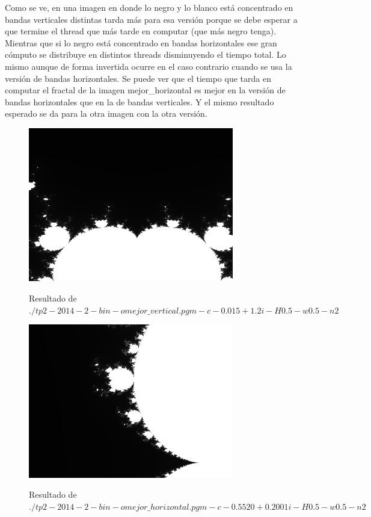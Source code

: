\documentclass[a4paper,10pt]{article}
\begin{document}
Como se ve, en una imagen en donde lo negro y lo blanco está concentrado en bandas verticales distintas tarda más para esa versión porque se debe esperar a que termine el thread que más tarde en computar (que más negro tenga). Mientras que si lo negro está concentrado en bandas horizontales ese gran cómputo se distribuye en distintos threads disminuyendo el tiempo total. Lo mismo aunque de forma invertida ocurre en el caso contrario cuando se usa la versión de bandas horizontales.
Se puede ver que el tiempo que tarda en computar el fractal de la imagen mejor\_horizontal es mejor en la versión de bandas horizontales que en la de bandas verticales. Y el mismo resultado esperado se da para la otra imagen con la otra versión.

\begin{figure}[H]
\begin{center}
\includegraphics[width=0.8\textwidth]{./mejorVertical.png}
\label{fig:def}
\caption{Resultado de $./tp2-2014-2-bin -o mejor\_vertical.pgm -c -0.015+1.2i -H 0.5 -w 0.5 -n 2$}
\end{center}
\end{figure}

\begin{figure}[H]
\begin{center}
\includegraphics[width=0.8\textwidth]{./mejorHorizontal.png}
\label{fig:def}
\caption{Resultado de $./tp2-2014-2-bin -o mejor\_horizontal.pgm -c -0.5520+0.2001i -H 0.5 -w 0.5 -n 2$}
\end{center}
\end{figure}
\end{document}
